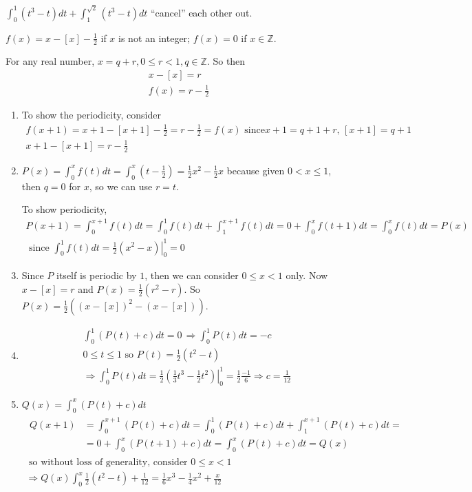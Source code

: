 \documentclass[twoside]{amsart}
\theoremstyle{plain}
\theoremstyle{definition}
\newcommand{\exercisehead}[1]
  {\smallskip
   \noindent{\small\bf Exercise #1.}}
\begin{document}
$\int_0^1 (t^3 - t)dt + \int_1^{\sqrt{2}} (t^3 - t)dt$ ``cancel'' each other out.  

\exercisehead{18} $f(x)=x -[x] - \frac{1}{2}$ if $x$ is not an integer; $f(x) = 0 $ if $x\in \mathbb{Z}$.  

For any real number, $x = q+r, 0 \leq r <1, q \in \mathbb{Z}$.  So then 
\[
\begin{gathered}
  x - [x] = r \\
  f(x) = r - \frac{1}{2} 
\end{gathered}
\]
\begin{enumerate}
\item To show the periodicity, consider
\[
\begin{gathered}
  f(x+1) = x+1 - [x+1] - \frac{1}{2} = r - \frac{1}{2} = f(x) \text{ since}
  x+1 = q+1 +r , \, [x+1] = q+1 \\
  x+1 - [x+1] = r - \frac{1}{2}
\end{gathered}
\]
\item $P(x) = \int_0^x f(t) dt = \int_0^x (t - \frac{1}{2}) = \frac{1}{2} x^2 - \frac{1}{2} x$ because given $0< x \leq 1$, then $q=0$ for $x$, so we can use $r=t$.  

To show periodicity,
\[
\begin{gathered}
  P(x+1) = \int_0^{x+1} f(t) dt = \int_0^1 f(t)dt + \int_1^{x+1} f(t)dt = 0 +\int_0^x f(t+1)dt = \int_0^x f(t)dt = P(x) \\
  \text{ since } \int_0^1 f(t)dt = \left. \frac{1}{2} (x^2 - x) \right|_0^1 = 0
\end{gathered}
\]
\item Since $P$ itself is periodic by $1$, then we can consider $0\leq x <1$ only.  Now $x-[x]=r$ and $P(x) = \frac{1}{2} (r^2 - r)$.  So $P(x) = \frac{1}{2} ( (x-[x])^2 - (x-[x]))$.  
\item \[
\begin{gathered}
  \int_0^1 (P(t) +c ) dt = 0 \, \Longrightarrow \int_0^1 P(t) dt = -c \\
  0 \leq t \leq 1 \text{ so } P(t) = \frac{1}{2} (t^2 - t)  \\
  \Longrightarrow \int_0^1 P(t) dt = \frac{1}{2} \left. \left( \frac{1}{3} t^3 - \frac{1}{2} t^2 \right) \right|_0^1 = \frac{1}{2} \frac{-1}{6} \Longrightarrow \boxed{ c = \frac{1}{12} }
\end{gathered}
\]
\item $Q(x) = \int_0^x (P(t) + c) dt $
\[
\begin{gathered}
  \begin{aligned}
    Q(x+1) & = \int_0^{x+1} (P(t) +c)dt = \int_0^1 (P(t)+c)dt + \int_1^{x+1} (P(t) +c)dt = \\ 
    & = 0 + \int_0^x (P(t+1)+c) dt = \int_0^x (P(t) +c ) dt = Q(x) 
  \end{aligned} \\
\text{ so without loss of generality, consider } 0 \leq x < 1 \\
\Longrightarrow Q(x) \int_0^x \frac{1}{2} (t^2 - t) + \frac{1}{12} = \boxed{ \frac{1}{6}x^3 - \frac{1}{4} x^2 + \frac{x}{12} }
\end{gathered}
\]
\end{enumerate} 
\end{document}
